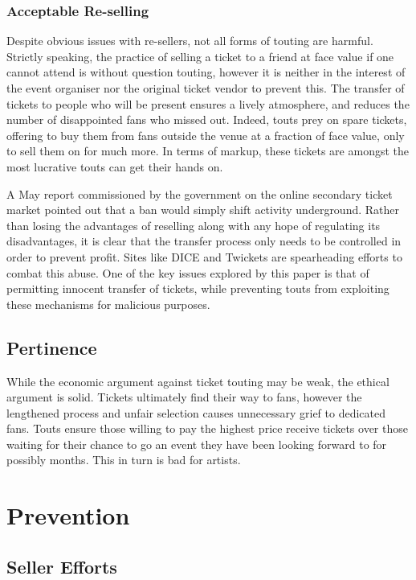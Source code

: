 \documentclass[12pt]{bhamdissertation}
\begin{document}
\subsubsection{Acceptable Re-selling}

Despite obvious issues with re-sellers, not all forms of touting are harmful. Strictly speaking, the practice of selling a ticket to a friend at face value if one cannot attend is without question touting, however it is neither in the interest of the event organiser nor the original ticket vendor to prevent this. The transfer of tickets to people who will be present ensures a lively atmosphere, and reduces the number of disappointed fans who missed out. Indeed, touts prey on spare tickets, offering to buy them from fans outside the venue at a fraction of face value, only to sell them on for much more. In terms of markup, these tickets are amongst the most lucrative touts can get their hands on.

A May report commissioned by the government on the online secondary ticket market pointed out that a ban would simply shift activity underground. Rather than losing the advantages of reselling along with any hope of regulating its disadvantages, it is clear that the transfer process only needs to be controlled in order to prevent profit. Sites like DICE and Twickets are spearheading efforts to combat this abuse. One of the key issues explored by this paper is that of permitting innocent transfer of tickets, while preventing touts from exploiting these mechanisms for malicious purposes.

\subsection{Pertinence}

While the economic argument against ticket touting may be weak, the ethical argument is solid. Tickets ultimately find their way to fans, however the lengthened process and unfair selection causes unnecessary grief to dedicated fans. Touts ensure those willing to pay the highest price receive tickets over those waiting for their chance to go an event they have been looking forward to for possibly months. This in turn is bad for artists.

\section{Prevention}

\subsection{Seller Efforts}
\end{document}
